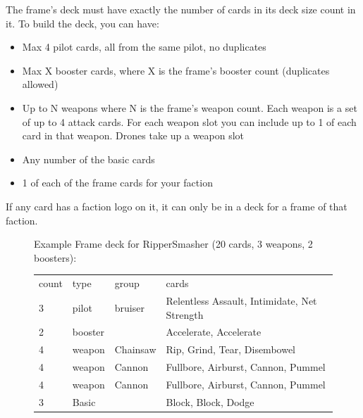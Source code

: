 \documentclass[a4paper, twocolumn]{article}
\begin{document}
The frame's deck must have exactly the number of cards in its deck size count in it.
To build the deck, you can have:

\begin{itemize}
\item Max 4 pilot cards, all from the same pilot, no duplicates
\item Max X booster cards, where X is the frame's booster count (duplicates allowed)
\item Up to N weapons where N is the frame's weapon count. Each weapon is a set of up to 4 attack cards.
 For each weapon slot you can include up to 1 of each card in that weapon.
 Drones take up a weapon slot
\item Any number of the basic cards
\item 1 of each of the frame cards for your faction 
\end{itemize}

If any card has a faction logo on it, it can only be in a deck for a frame of that faction.


\begin{figure}[!ht]
  \centering
Example Frame deck for RipperSmasher (20 cards, 3 weapons, 2 boosters): 
\begin{tabular}{l l l p{3cm}}
count & type & group & cards \\
3& pilot & bruiser & Relentless Assault, Intimidate, Net Strength\\
2 &booster& & Accelerate, Accelerate \\
4&weapon & Chainsaw & Rip, Grind, Tear, Disembowel \\
4&weapon & Cannon & Fullbore, Airburst, Cannon, Pummel \\
4&weapon & Cannon & Fullbore, Airburst, Cannon, Pummel \\
3&Basic& & Block, Block, Dodge \\
\end{tabular}
\end{figure}
\end{document}
